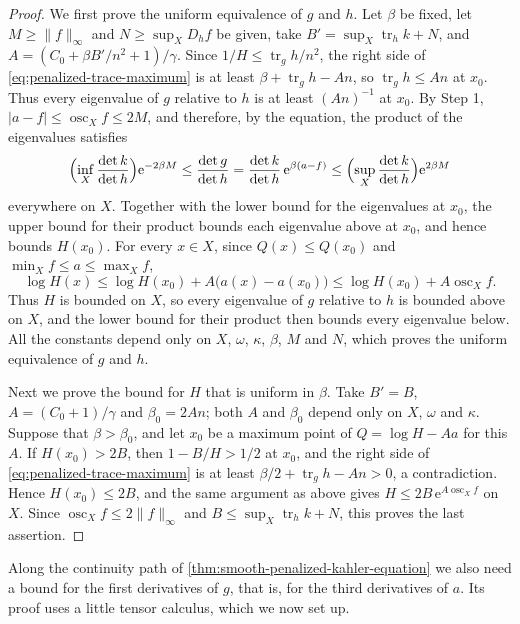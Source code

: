 \begin{proof}
We first prove the uniform equivalence of $g$ and $h$. Let $\beta$ be fixed, let $M\geq\|f\|_\infty$ and $N\geq\sup_XD_hf$ be given, take $B'=\sup_X\operatorname{tr}_hk+N$, and $A=(C_0+\beta B'/n^2+1)/\gamma$. Since $1/H\leq\operatorname{tr}_gh/n^2$, the right side of \eqref{eq:penalized-trace-maximum} is at least $\beta+\operatorname{tr}_gh-An$, so $\operatorname{tr}_gh\leq An$ at $x_0$. Thus every eigenvalue of $g$ relative to $h$ is at least $(An)^{-1}$ at $x_0$. By Step 1, $|a-f|\leq\operatorname{osc}_Xf\leq2M$, and therefore, by the equation, the product of the eigenvalues satisfies
\[
 \Bigl(\inf_X\frac{\det k}{\det h}\Bigr)\mathrm e^{-2\beta M}
 \leq\frac{\det g}{\det h}=\frac{\det k}{\det h}\,\mathrm e^{\beta(a-f)}
 \leq\Bigl(\sup_X\frac{\det k}{\det h}\Bigr)\mathrm e^{2\beta M}
\]
everywhere on $X$. Together with the lower bound for the eigenvalues at $x_0$, the upper bound for their product bounds each eigenvalue above at $x_0$, and hence bounds $H(x_0)$. For every $x\in X$, since $Q(x)\leq Q(x_0)$ and $\min_Xf\leq a\leq\max_Xf$,
\[
 \log H(x)\leq\log H(x_0)+A\bigl(a(x)-a(x_0)\bigr)
 \leq\log H(x_0)+A\operatorname{osc}_Xf.
\]
Thus $H$ is bounded on $X$, so every eigenvalue of $g$ relative to $h$ is bounded above on $X$, and the lower bound for their product then bounds every eigenvalue below. All the constants depend only on $X$, $\omega$, $\kappa$, $\beta$, $M$ and $N$, which proves the uniform equivalence of $g$ and $h$.

Next we prove the bound for $H$ that is uniform in $\beta$. Take $B'=B$, $A=(C_0+1)/\gamma$ and $\beta_0=2An$; both $A$ and $\beta_0$ depend only on $X$, $\omega$ and $\kappa$. Suppose that $\beta>\beta_0$, and let $x_0$ be a maximum point of $Q=\log H-Aa$ for this $A$. If $H(x_0)>2B$, then $1-B/H>1/2$ at $x_0$, and the right side of \eqref{eq:penalized-trace-maximum} is at least $\beta/2+\operatorname{tr}_gh-An>0$, a contradiction. Hence $H(x_0)\leq2B$, and the same argument as above gives $H\leq2B\,\mathrm e^{A\operatorname{osc}_Xf}$ on $X$. Since $\operatorname{osc}_Xf\leq2\|f\|_\infty$ and $B\leq\sup_X\operatorname{tr}_hk+N$, this proves the last assertion.
\end{proof}

Along the continuity path of \cref{thm:smooth-penalized-kahler-equation} we also need a bound for the first derivatives of $g$, that is, for the third derivatives of $a$. Its proof uses a little tensor calculus, which we now set up.

